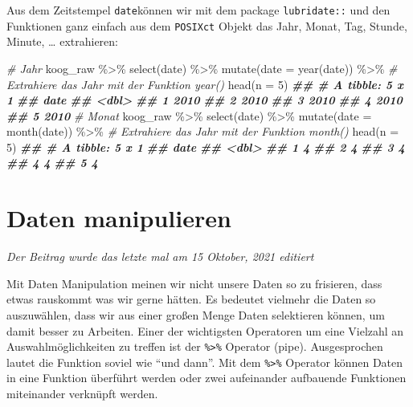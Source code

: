\documentclass[
]{article}
\newenvironment{Shaded}{\begin{snugshade}}{\end{snugshade}}
\newcommand{\AttributeTok}[1]{\textcolor[rgb]{0.77,0.63,0.00}{#1}}
\newcommand{\CommentTok}[1]{\textcolor[rgb]{0.56,0.35,0.01}{\textit{#1}}}
\newcommand{\DecValTok}[1]{\textcolor[rgb]{0.00,0.00,0.81}{#1}}
\newcommand{\DocumentationTok}[1]{\textcolor[rgb]{0.56,0.35,0.01}{\textbf{\textit{#1}}}}
\newcommand{\FunctionTok}[1]{\textcolor[rgb]{0.00,0.00,0.00}{#1}}
\newcommand{\NormalTok}[1]{#1}
\newcommand{\SpecialCharTok}[1]{\textcolor[rgb]{0.00,0.00,0.00}{#1}}
\begin{document}
Aus dem Zeitstempel \texttt{date}können wir mit dem package \texttt{lubridate::} und den Funktionen ganz einfach aus dem \texttt{POSIXct} Objekt das Jahr, Monat, Tag, Stunde, Minute, \ldots{} extrahieren:

\begin{Shaded}
\begin{Highlighting}[]
\CommentTok{\# Jahr}
\NormalTok{koog\_raw }\SpecialCharTok{\%\textgreater{}\%}
  \FunctionTok{select}\NormalTok{(date) }\SpecialCharTok{\%\textgreater{}\%}
  \FunctionTok{mutate}\NormalTok{(}\AttributeTok{date =} \FunctionTok{year}\NormalTok{(date)) }\SpecialCharTok{\%\textgreater{}\%} \CommentTok{\# Extrahiere das Jahr mit der Funktion \textasciigrave{}year()\textasciigrave{}}
  \FunctionTok{head}\NormalTok{(}\AttributeTok{n =} \DecValTok{5}\NormalTok{)}
\DocumentationTok{\#\# \# A tibble: 5 x 1}
\DocumentationTok{\#\#    date}
\DocumentationTok{\#\#   \textless{}dbl\textgreater{}}
\DocumentationTok{\#\# 1  2010}
\DocumentationTok{\#\# 2  2010}
\DocumentationTok{\#\# 3  2010}
\DocumentationTok{\#\# 4  2010}
\DocumentationTok{\#\# 5  2010}
\CommentTok{\# Monat}
\NormalTok{koog\_raw }\SpecialCharTok{\%\textgreater{}\%}
  \FunctionTok{select}\NormalTok{(date) }\SpecialCharTok{\%\textgreater{}\%}
  \FunctionTok{mutate}\NormalTok{(}\AttributeTok{date =} \FunctionTok{month}\NormalTok{(date)) }\SpecialCharTok{\%\textgreater{}\%} \CommentTok{\# Extrahiere das Jahr mit der Funktion \textasciigrave{}month()\textasciigrave{}}
  \FunctionTok{head}\NormalTok{(}\AttributeTok{n =} \DecValTok{5}\NormalTok{)}
\DocumentationTok{\#\# \# A tibble: 5 x 1}
\DocumentationTok{\#\#    date}
\DocumentationTok{\#\#   \textless{}dbl\textgreater{}}
\DocumentationTok{\#\# 1     4}
\DocumentationTok{\#\# 2     4}
\DocumentationTok{\#\# 3     4}
\DocumentationTok{\#\# 4     4}
\DocumentationTok{\#\# 5     4}
\end{Highlighting}
\end{Shaded}

\hypertarget{daten-manipulieren}{%
\section{Daten manipulieren}\label{daten-manipulieren}}

\emph{Der Beitrag wurde das letzte mal am 15 Oktober, 2021 editiert}

Mit Daten Manipulation meinen wir nicht unsere Daten so zu frisieren, dass etwas rauskommt was wir gerne hätten. Es bedeutet vielmehr die Daten so auszuwählen, dass wir aus einer großen Menge Daten selektieren können, um damit besser zu Arbeiten. Einer der wichtigsten Operatoren um eine Vielzahl an Auswahlmöglichkeiten zu treffen ist der \texttt{\%\textgreater{}\%} Operator (pipe). Ausgesprochen lautet die Funktion soviel wie ``und dann''. Mit dem \texttt{\%\textgreater{}\%} Operator können Daten in eine Funktion überführt werden oder zwei aufeinander aufbauende Funktionen miteinander verknüpft werden.
\end{document}
